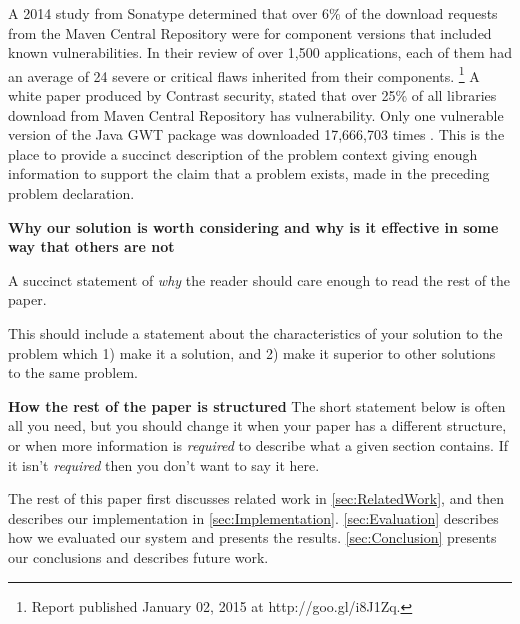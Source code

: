 \documentclass[pdf,bookmarks,colorlinks=true]{IEEEtran}
\begin{document}
A 2014 study from Sonatype determined that over 6\% of the download requests from the Maven Central Repository were for component versions that included known vulnerabilities. In their review of over 1,500 applications, each of them had an average of 24 severe or critical flaws inherited from their components. \footnote{Report published January 02, 2015 at http://goo.gl/i8J1Zq.}
A white paper produced by Contrast security, stated that over 25\% of all libraries download from Maven Central Repository has vulnerability. Only one vulnerable version of the Java GWT package was downloaded 17,666,703 times \cite{williams2012unfortunate,Kula2018,Decan2018,pashchenko2018esem,Derr2017,Alqahtani2017,Nguyen2016,Alqahtani2016,Plate2015,Cox2015,Cadariu2015,Perl2015,Nguyen2013,Williams2012}.
This is the place to provide a succinct description of the problem context
giving enough information to support the claim that a problem exists, made in
the preceding problem declaration.



\textbf{Why our solution is worth considering and why is it effective
in some way that others are not}

A succinct statement of {\em why} the reader should care enough to read the
rest of the paper.

This should include a statement about the characteristics of your solution to
the problem which 1) make it a solution, and 2) make it superior to other
solutions to the same problem.



\textbf{How the rest of the paper is structured}
The short statement below is often all you need, but you should change it when
your paper has a different structure, or when more information is {\em
required} to describe what a given section contains. If it isn't {\em required}
then you don't want to say it here.


The rest of this paper first discusses related work in
\ref{sec:RelatedWork}, and then describes our implementation in
\ref{sec:Implementation}. \ref{sec:Evaluation} describes how we evaluated
our system and presents the results. \ref{sec:Conclusion} presents our
conclusions and describes future work.
\end{document}
